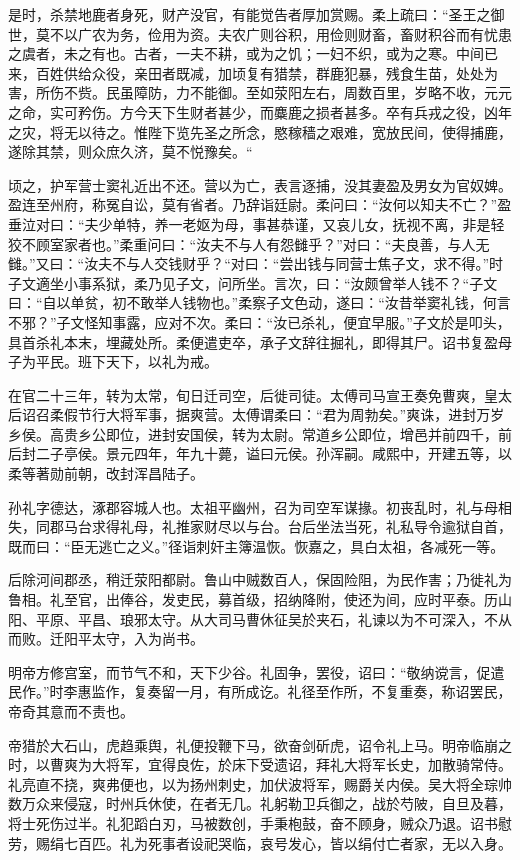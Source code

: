 \documentclass[12pt,UTF8]{ctexbook}
\begin{document}
是时，杀禁地鹿者身死，财产没官，有能觉告者厚加赏赐。柔上疏曰：“圣王之御世，莫不以广农为务，俭用为资。夫农广则谷积，用俭则财畜，畜财积谷而有忧患之虞者，未之有也。古者，一夫不耕，或为之饥；一妇不织，或为之寒。中间已来，百姓供给众役，亲田者既减，加顷复有猎禁，群鹿犯暴，残食生苗，处处为害，所伤不赀。民虽障防，力不能御。至如荥阳左右，周数百里，岁略不收，元元之命，实可矜伤。方今天下生财者甚少，而麋鹿之损者甚多。卒有兵戎之役，凶年之灾，将无以待之。惟陛下览先圣之所念，愍稼穑之艰难，宽放民间，使得捕鹿，遂除其禁，则众庶久济，莫不悦豫矣。“

顷之，护军营士窦礼近出不还。营以为亡，表言逐捕，没其妻盈及男女为官奴婢。盈连至州府，称冤自讼，莫有省者。乃辞诣廷尉。柔问曰：“汝何以知夫不亡？”盈垂泣对曰：“夫少单特，养一老妪为母，事甚恭谨，又哀儿女，抚视不离，非是轻狡不顾室家者也。”柔重问曰：“汝夫不与人有怨雠乎？”对曰：“夫良善，与人无雠。”又曰：“汝夫不与人交钱财乎？“对曰：“尝出钱与同营士焦子文，求不得。”时子文適坐小事系狱，柔乃见子文，问所坐。言次，曰：“汝颇曾举人钱不？“子文曰：“自以单贫，初不敢举人钱物也。”柔察子文色动，遂曰：“汝昔举窦礼钱，何言不邪？”子文怪知事露，应对不次。柔曰：“汝已杀礼，便宜早服。”子文於是叩头，具首杀礼本末，埋藏处所。柔便遣吏卒，承子文辞往掘礼，即得其尸。诏书复盈母子为平民。班下天下，以礼为戒。

在官二十三年，转为太常，旬日迁司空，后徙司徒。太傅司马宣王奏免曹爽，皇太后诏召柔假节行大将军事，据爽营。太傅谓柔曰：“君为周勃矣。”爽诛，进封万岁乡侯。高贵乡公即位，进封安国侯，转为太尉。常道乡公即位，增邑并前四千，前后封二子亭侯。景元四年，年九十薨，谥曰元侯。孙浑嗣。咸熙中，开建五等，以柔等著勋前朝，改封浑昌陆子。

孙礼字德达，涿郡容城人也。太祖平幽州，召为司空军谋掾。初丧乱时，礼与母相失，同郡马台求得礼母，礼推家财尽以与台。台后坐法当死，礼私导令逾狱自首，既而曰：“臣无逃亡之义。”径诣刺奸主簿温恢。恢嘉之，具白太祖，各减死一等。

后除河间郡丞，稍迁荥阳都尉。鲁山中贼数百人，保固险阻，为民作害；乃徙礼为鲁相。礼至官，出俸谷，发吏民，募首级，招纳降附，使还为间，应时平泰。历山阳、平原、平昌、琅邪太守。从大司马曹休征吴於夹石，礼谏以为不可深入，不从而败。迁阳平太守，入为尚书。

明帝方修宫室，而节气不和，天下少谷。礼固争，罢役，诏曰：“敬纳谠言，促遣民作。”时李惠监作，复奏留一月，有所成讫。礼径至作所，不复重奏，称诏罢民，帝奇其意而不责也。

帝猎於大石山，虎趋乘舆，礼便投鞭下马，欲奋剑斫虎，诏令礼上马。明帝临崩之时，以曹爽为大将军，宜得良佐，於床下受遗诏，拜礼大将军长史，加散骑常侍。礼亮直不挠，爽弗便也，以为扬州刺史，加伏波将军，赐爵关内侯。吴大将全琮帅数万众来侵寇，时州兵休使，在者无几。礼躬勒卫兵御之，战於芍陂，自旦及暮，将士死伤过半。礼犯蹈白刃，马被数创，手秉枹鼓，奋不顾身，贼众乃退。诏书慰劳，赐绢七百匹。礼为死事者设祀哭临，哀号发心，皆以绢付亡者家，无以入身。
\end{document}
